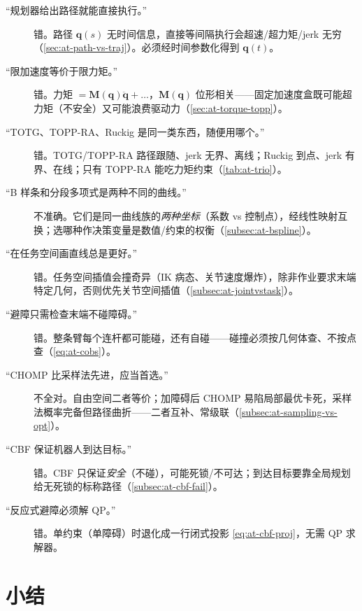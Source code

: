 \begin{description}
  \item[“规划器给出路径就能直接执行。”] 错。路径 $\mathbf{q}(s)$ 无时间信息，直接等间隔执行会超速/超力矩/jerk 无穷（\cref{sec:at-path-vs-traj}）。必须经时间参数化得到 $\mathbf{q}(t)$。
  \item[“限加速度等价于限力矩。”] 错。力矩 $=\mathbf{M}(\mathbf{q})\ddot{\mathbf{q}}+\dots$，$\mathbf{M}(\mathbf{q})$ 位形相关——固定加速度盒既可能超力矩（不安全）又可能浪费驱动力（\cref{sec:at-torque-topp}）。
  \item[“TOTG、TOPP-RA、Ruckig 是同一类东西，随便用哪个。”] 错。TOTG/TOPP-RA 路径跟随、jerk 无界、离线；Ruckig 到点、jerk 有界、在线；只有 TOPP-RA 能吃力矩约束（\cref{tab:at-trio}）。
  \item[“B 样条和分段多项式是两种不同的曲线。”] 不准确。它们是同一曲线族的\emph{两种坐标}（系数 vs 控制点），经线性映射互换；选哪种作决策变量是数值/约束的权衡（\cref{subsec:at-bspline}）。
  \item[“在任务空间画直线总是更好。”] 错。任务空间插值会撞奇异（IK 病态、关节速度爆炸），除非作业要求末端特定几何，否则优先关节空间插值（\cref{subsec:at-jointvstask}）。
  \item[“避障只需检查末端不碰障碍。”] 错。整条臂每个连杆都可能碰，还有自碰——碰撞必须按几何体查、不按点查（\cref{eq:at-cobs}）。
  \item[“CHOMP 比采样法先进，应当首选。”] 不全对。自由空间二者等价；加障碍后 CHOMP 易陷局部最优卡死，采样法概率完备但路径曲折——二者互补、常级联（\cref{subsec:at-sampling-vs-opt}）。
  \item[“CBF 保证机器人到达目标。”] 错。CBF 只保证\emph{安全}（不碰），可能死锁/不可达；到达目标要靠全局规划给无死锁的标称路径（\cref{subsec:at-cbf-fail}）。
  \item[“反应式避障必须解 QP。”] 错。单约束（单障碍）时退化成一行闭式投影 \cref{eq:at-cbf-proj}，无需 QP 求解器。
\end{description}

\section*{小结}

